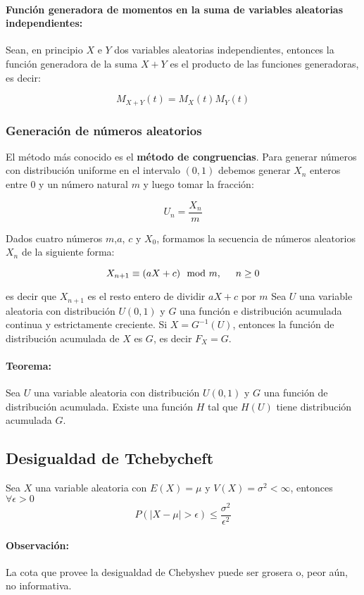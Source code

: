 \paragraph{Función generadora de momentos en la suma de variables aleatorias independientes:} Sean, en principio $X$ e $Y$ dos variables aleatorias independientes, entonces la función generadora de la suma $X+Y$ es el producto de las funciones generadoras, es decir:

$$M_{X+Y}(t) = M_X(t)M_Y(t)$$

\subsubsection{Generación de números aleatorios}
El método más conocido es el \textbf{método de congruencias}. Para generar números con distribución uniforme en el intervalo $(0,1)$ debemos generar $X_n$ enteros entre $0$ y un número natural $m$ y luego tomar la fracción:

$$U_n = \frac{X_n}{m}$$

Dados cuatro números $m$,$a$, $c$ y $X_0$, formamos la secuencia de números aleatorios $X_n$ de la siguiente forma:

$$X_{n+1} \equiv (aX + c) \mod m, \hspace*{5mm} n \geq 0$$

es decir que $X_{n+1}$ es el resto entero de dividir $aX + c$ por $m$
Sea $U$ una variable aleatoria con distribución $U(0,1)$ y $G$ una función e distribución acumulada continua y estrictamente creciente. Si $X=G^{-1}(U)$, entonces la función de distribución acumulada de $X$ es $G$, es decir $F_X = G$.

\paragraph{Teorema:} Sea $U$ una variable aleatoria con distribución $U(0,1)$ y $G$ una función de distribución acumulada. Existe una función $H$ tal que $H(U)$ tiene distribución acumulada $G$.

\subsection{Desigualdad de Tchebycheft}
Sea $X$ una variable aleatoria con $E(X) = \mu$ y $V(X) = \sigma^2 < \infty$, entonces $\forall \epsilon > 0$  $$P(|X-\mu| > \epsilon) \leq \frac{\sigma^2}{\epsilon^2}$$

\paragraph{Observación:} La cota que provee la desigualdad de Chebyshev puede ser grosera o, peor aún, no informativa.

